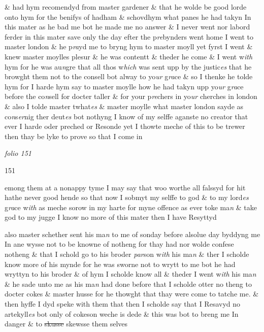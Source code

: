 \documentclass[12pt, a4paper]{book}
\begin{document}
 \& had hym recomendyd from master gardener \& that he wolde
 be good lorde onto hym for the benifys of hadham \& schovdhym
 what panes he had takyn In this mater  as he bad me
			 bot he made me no
 answer \& I never went nor labord ferder in this mater save
 only the day efter the p\textit{re}bynders went home I went to
 		master london \& he p\textit{ra}yd me to bryng hym to master moyll
 		yet fyrst I went \& knew master moylles plesur \& he was
 contentt \& theder he come \& I went w\textit{ith} hym for he was au\textit{n}gre
 that all thos w\textit{hich} was sent upp by the justic\textit{es} that he browght
 them not to the consell bot alway to yo\textit{ur} g\textit{ra}ce \& so I thenke he
 		tolde hym for I harde hym say to master moylle how he had
 takyn upp yo\textit{ur }g\textit{ra}ce before the co\textit{n}sell for docter taller \& for
			 your
 		p\textit{re}chers in yo\textit{ur} cherches in london \& also I tolde master twhat\textit{es} \&
 		master moylle what master london sayde as co\textit{n}s\textit{er}nig ther deut\textit{es}
 bot nothyng I know of my selffe aganste no creator that ever I
 harde oder preched or Resonde yet I thowte meche of this
 to be trewer then thay be lyke to prove so that I come in

\dotfill
					

\textit{folio 151}


\begin{flushright}{\color{Mahogany}151}\end{flushright}
 
		\ifthenelse{\isodd{\thepage}}
		{\reversemarginpar}
		{\normalmarginpar}
		emong them at a nonappy tyme I may say that woo worthe
 all falssyd for hit hathe never good hende so that now I sobmyt
 my selffe to god \& to my lord\textit{es} g\textit{ra}ce w\textit{ith} as meche sorow in my
 harte for myne offence as ever toke ma\textit{n} \& take god to my jugge
 I know no more of this mater then I have Resyttyd
 	
		\ifthenelse{\isodd{\thepage}}
		{\reversemarginpar}
		{\normalmarginpar}
		also master schether sent his ma\textit{n} to me of sonday before alsolue day
 byddyng me In ane wysse not to be knowne of notheng for thay
 had nor wolde confese notheng \& that I schold go to his broder \textit{par}son
 w\textit{ith} his ma\textit{n} \& ther I scholde know more of his mynde for he was sworne
 not to wrytt to me bot he had wryttyn to his broder \& of hym I
 scholde know all \& theder I went w\textit{ith} his ma\textit{n} \& he sade unto
 me as his ma\textit{n} had done before that I scholde otter no theng to
 docter cokes \& master husse for he thowght that thay were
 come to
			 tatche me. \& then hyffe I dyd speke with them that then I
 scholde say that I Resavyd no artekyll\textit{es} bot only of cokeson
 weche is dede \& this was bot to breng me In danger \& to
 \sout{skusse} skewsse them selves
 	
\end{document}
